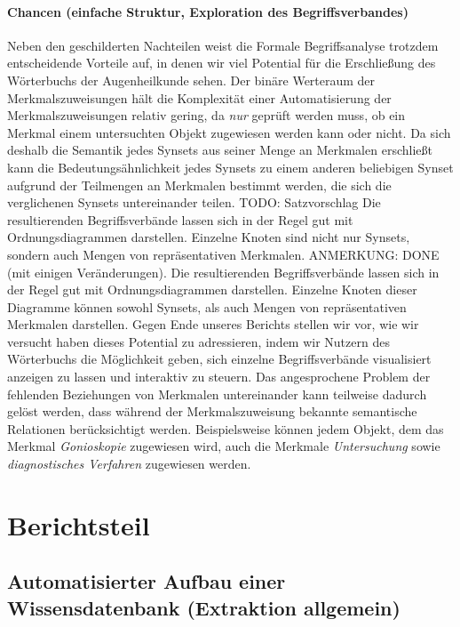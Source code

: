 \documentclass[pagesize,DIV=calc,12pt,draft]{scrreprt}
\begin{document}
\subsubsection{Chancen (einfache Struktur, Exploration des Begriffsverbandes)}

Neben den geschilderten Nachteilen weist die Formale Begriffsanalyse trotzdem entscheidende Vorteile auf, in denen wir viel Potential für die Erschließung des Wörterbuchs der Augenheilkunde sehen. 
Der binäre Werteraum der Merkmalszuweisungen hält die Komplexität einer Automatisierung der Merkmalszuweisungen relativ gering, da \emph{nur} geprüft werden muss, ob ein Merkmal einem untersuchten Objekt zugewiesen werden kann oder nicht. 
Da sich deshalb die Semantik jedes Synsets aus seiner Menge an Merkmalen erschließt kann die Bedeutungsähnlichkeit jedes Synsets zu einem anderen beliebigen Synset aufgrund der Teilmengen an Merkmalen bestimmt werden, die sich die verglichenen Synsets untereinander teilen. 
TODO: Satzvorschlag
Die resultierenden Begriffsverbände lassen sich in der Regel gut mit Ordnungsdiagrammen darstellen.
Einzelne Knoten sind nicht nur Synsets, sondern auch Mengen von repräsentativen Merkmalen.
ANMERKUNG: DONE (mit einigen Veränderungen).
Die resultierenden Begriffsverbände lassen sich in der Regel gut mit Ordnungsdiagrammen darstellen.
Einzelne Knoten dieser Diagramme können sowohl Synsets, als auch Mengen von repräsentativen Merkmalen darstellen. 
Gegen Ende unseres Berichts stellen wir vor, wie wir versucht haben dieses Potential zu adressieren, indem wir Nutzern des Wörterbuchs die Möglichkeit geben, sich einzelne Begriffsverbände visualisiert anzeigen zu lassen und interaktiv zu steuern. 
Das angesprochene Problem der fehlenden Beziehungen von Merkmalen untereinander kann teilweise dadurch gelöst werden, dass während der Merkmalszuweisung bekannte semantische Relationen berücksichtigt werden. 
Beispielsweise können jedem Objekt, dem das Merkmal \emph{Gonioskopie} zugewiesen wird, auch die Merkmale \emph{Untersuchung} sowie \emph{diagnostisches Verfahren} zugewiesen werden. 

\chapter{Berichtsteil}

\section{Automatisierter Aufbau einer Wissensdatenbank (Extraktion allgemein)}
\end{document}
